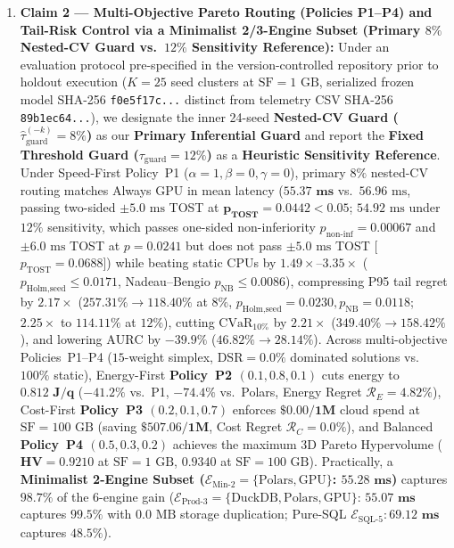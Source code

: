 \documentclass[10pt,a4paper]{article}
\begin{document}
\begin{enumerate}[leftmargin=1.5em,itemsep=3pt]
    \item \textbf{Claim 2 --- Multi-Objective Pareto Routing (Policies P1--P4) and Tail-Risk Control via a Minimalist 2/3-Engine Subset (Primary $8\%$ Nested-CV Guard vs.\ $12\%$ Sensitivity Reference):} Under an evaluation protocol pre-specified in the version-controlled repository prior to holdout execution ($K=25$ seed clusters at $\text{SF}=1\text{ GB}$, serialized frozen model SHA-256 \texttt{f0e5f17c...} distinct from telemetry CSV SHA-256 \texttt{89b1ec64...}), we designate the inner 24-seed \textbf{Nested-CV Guard ($\hat{\tau}_{\text{guard}}^{(-k)}=8\%$)} as our \textbf{Primary Inferential Guard} and report the \textbf{Fixed Threshold Guard ($\tau_{\text{guard}}=12\%$)} as a \textbf{Heuristic Sensitivity Reference}. Under Speed-First Policy~P1 ($\alpha=1,\beta=0,\gamma=0$), primary $8\%$ nested-CV routing matches Always GPU in mean latency ($\mathbf{55.37\text{ ms}}$ vs.\ $56.96\text{ ms}$, passing two-sided $\pm 5.0\text{ ms}$ TOST at $\mathbf{p_{\text{TOST}}=0.0442 < 0.05}$; $54.92\text{ ms}$ under $12\%$ sensitivity, which passes one-sided non-inferiority $p_{\text{non-inf}}=0.00067$ and $\pm 6.0\text{ ms}$ TOST at $p=0.0241$ but does not pass $\pm 5.0\text{ ms}$ TOST [$p_{\text{TOST}}=0.0688$]) while beating static CPUs by $1.49\times\text{--}3.35\times$ ($p_{\text{Holm,seed}}\le 0.0171$, Nadeau--Bengio $p_{\text{NB}}\le 0.0086$), compressing P95 tail regret by $\mathbf{2.17\times}$ ($257.31\% \rightarrow \mathbf{118.40\%}$ at $8\%$, $p_{\text{Holm,seed}}=0.0230, p_{\text{NB}}=0.0118$; $\mathbf{2.25\times}$ to $\mathbf{114.11\%}$ at $12\%$), cutting $\text{CVaR}_{10\%}$ by $\mathbf{2.21\times}$ ($349.40\% \rightarrow \mathbf{158.42\%}$), and lowering $\text{AURC}$ by $\mathbf{-39.9\%}$ ($46.82\% \rightarrow 28.14\%$). Across multi-objective Policies~P1--P4 ($15$-weight simplex, $\text{DSR}=\mathbf{0.0\%}$ dominated solutions vs.\ $100\%$ static), Energy-First \textbf{Policy~P2 $(0.1,0.8,0.1)$} cuts energy to $\mathbf{0.812\text{ J/q}}$ ($\mathbf{-41.2\%}$ vs.\ P1, $\mathbf{-74.4\%}$ vs.\ Polars, Energy Regret $\mathcal{R}_E=4.82\%$), Cost-First \textbf{Policy~P3 $(0.2,0.1,0.7)$} enforces $\mathbf{\$0.00/1\text{M}}$ cloud spend at $\text{SF}=100\text{ GB}$ (saving $\mathbf{\$507.06/1\text{M}}$, Cost Regret $\mathcal{R}_C=0.0\%$), and Balanced \textbf{Policy~P4 $(0.5,0.3,0.2)$} achieves the maximum 3D Pareto Hypervolume ($\mathbf{\text{HV}=0.9210}$ at $\text{SF}=1\text{ GB}$, $\mathbf{0.9340}$ at $\text{SF}=100\text{ GB}$). Practically, a \textbf{Minimalist 2-Engine Subset ($\mathcal{E}_{\text{Min-2}}=\{\text{Polars},\text{GPU}\}$: $\mathbf{55.28\text{ ms}}$)} captures $\mathbf{98.7\%}$ of the 6-engine gain ($\mathcal{E}_{\text{Prod-3}}=\{\text{DuckDB},\text{Polars},\text{GPU}\}$: $\mathbf{55.07\text{ ms}}$ captures $\mathbf{99.5\%}$ with $0.0\text{ MB}$ storage duplication; Pure-SQL $\mathcal{E}_{\text{SQL-5}}: \mathbf{69.12\text{ ms}}$ captures $48.5\%$).

\end{enumerate}
\end{document}

